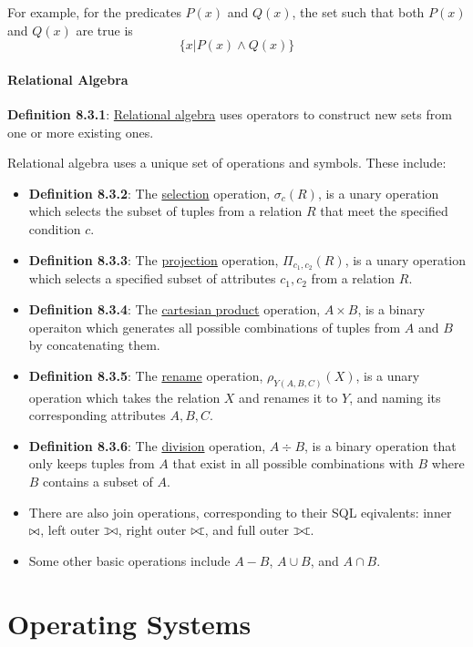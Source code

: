\documentclass{article}
\newcommand{\separate}[1] {\vspace{#1 pt}\noindent}
\newcommand{\definition}[2]{\textbf{Definition #1}: #2\label{def:#1}}
\newcommand{\ojoin}{\setbox0=\hbox{$\bowtie$}%
    \rule[-.02ex]{.25em}{.4pt}\llap{\rule[\ht0]{.25em}{.4pt}}}
\newcommand{\insertinnerjoin}{\mathbin{\bowtie\mkern-5.8mu}\;}
\newcommand{\insertleftouterjoin}{\mathbin{\ojoin\mkern-5.8mu\bowtie}}
\newcommand{\insertrightouterjoin}{\mathbin{\bowtie\mkern-5.8mu\ojoin}}
\newcommand{\insertfullouterjoin}{\mathbin{\ojoin\mkern-5.8mu\bowtie\mkern-5.8mu\ojoin}}
\begin{document}
\separate{7}For example, for the predicates \(P(x)\) and \(Q(x)\), the set such that both \(P(x)\) and \(Q(x)\) are true is 
\begin{equation}
    \{x|P(x) \land Q(x)\}
\end{equation}

\subsection{Relational Algebra}

\definition{8.3.1}{\underline{Relational algebra} uses operators to construct new sets from one or more existing ones.}

\separate{7}Relational algebra uses a unique set of operations and symbols. These include:
\begin{itemize}
    \item \definition{8.3.2}{The \underline{selection} operation, \(\sigma_c(R)\), is a unary operation which selects the subset of tuples from a relation \(R\) that meet the specified condition \(c\).}
    \item \definition{8.3.3}{The \underline{projection} operation, \(\Pi_{c_1,c_2}(R)\), is a unary operation which selects a specified subset of attributes \(c_1, c_2\) from a relation \(R\).}
    \item \definition{8.3.4}{The \underline{cartesian product} operation, \(A \times B\), is a binary operaiton which generates all possible combinations of tuples from \(A\) and \(B\) by concatenating them.}
    \item \definition{8.3.5}{The \underline{rename} operation, \(\rho_{Y(A,B,C)}(X)\), is a unary operation which takes the relation \(X\) and renames it to \(Y\), and naming its corresponding attributes \(A, B, C\).}
    \item \definition{8.3.6}{The \underline{division} operation, \(A \div B\), is a binary operation that only keeps tuples from \(A\) that exist in all possible combinations with \(B\) where \(B\) contains a subset of \(A\).}
    \item There are also join operations, corresponding to their SQL eqivalents: inner \(\insertinnerjoin\), left outer \(\insertleftouterjoin\), right outer \(\insertrightouterjoin\), and full outer \(\insertfullouterjoin\).
    \item Some other basic operations include \(A - B\), \(A \cup B\), and \(A \cap B\).
\end{itemize}

\newpage\part{Operating Systems}\label{part:4.os}
\end{document}
